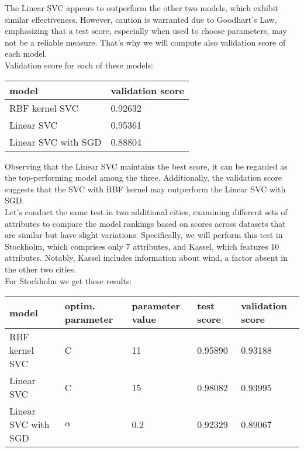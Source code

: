 \documentclass[a4paper]{article}
\begin{document}
	The Linear SVC appears to outperform the other two models, which exhibit similar effectiveness. However, caution is warranted due to Goodhart's Law, emphasizing that a test score, especially when used to choose parameters, may not be a reliable measure. That's why we will compute also validation score of each model.
	\\
	
	Validation score for each of these models:
	
	\begin{table}[!h]
		\begin{tabular}{|l|l|}
			\hline
			model &  validation score  \\ \hline
			RBF kernel SVC & 0.92632 \\ \hline
			Linear SVC & 0.95361 \\ \hline
			Linear SVC with SGD &  0.88804 \\ \hline
		\end{tabular}
	\end{table} 

	
	Observing that the Linear SVC maintains the best score, it can be regarded as the top-performing model among the three. Additionally, the validation score suggests that the SVC with RBF kernel may outperform the Linear SVC with SGD. 
	\\
	
	Let's conduct the same test in two additional cities, examining different sets of attributes to compare the model rankings based on scores across datasets that are similar but have slight variations. Specifically, we will perform this test in Stockholm, which comprises only 7 attributes, and Kassel, which features 10 attributes. Notably, Kassel includes information about wind, a factor absent in the other two cities.
	\\
	
	For Stockholm we get these results:
	\begin{table}[!h]
		\begin{tabular}{|l|l|l|l|l|}
			\hline
			model & optim. parameter & parameter value & test score & validation score \\ \hline
			RBF kernel SVC & C & 11 & 0.95890 & 0.93188 \\ \hline
			Linear SVC & C & 15 & 0.98082 & 0.93995 \\ \hline
			Linear SVC with SGD& $\alpha$ & 0.2 & 0.92329 & 0.89067 \\ \hline
		\end{tabular}
	\end{table} 
\end{document}
